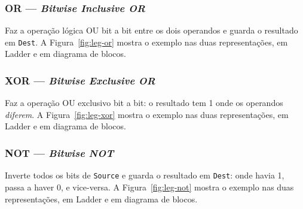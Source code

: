 \subsubsection{OR --- \emph{Bitwise Inclusive OR}}

Faz a operação lógica OU bit a bit entre os dois operandos e guarda o resultado em \texttt{Dest}.
A Figura~\ref{fig:leg-or} mostra o exemplo nas duas representações, em Ladder e em diagrama de blocos.



\subsubsection{XOR --- \emph{Bitwise Exclusive OR}}

Faz a operação OU exclusivo bit a bit: o resultado tem 1 onde os operandos \emph{diferem}.
A Figura~\ref{fig:leg-xor} mostra o exemplo nas duas representações, em Ladder e em diagrama de blocos.



\subsubsection{NOT --- \emph{Bitwise NOT}}

Inverte todos os bits de \texttt{Source} e guarda o resultado em \texttt{Dest}: onde havia 1, passa a
haver 0, e vice-versa.
A Figura~\ref{fig:leg-not} mostra o exemplo nas duas representações, em Ladder e em diagrama de blocos.




